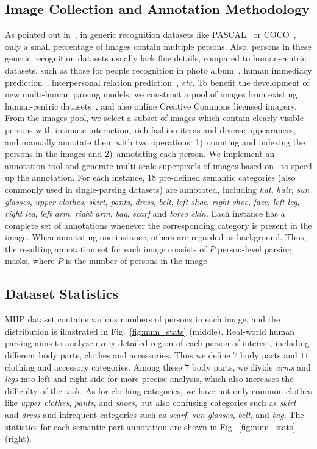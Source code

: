 \documentclass[10pt, letterpaper]{article}
\begin{document}
\subsection{Image Collection and Annotation Methodology}
As pointed out in~\cite{jiang2017detangling}, in generic recognition datasets like PASCAL~\cite{everingham2015pascal} or COCO~\cite{lin2014microsoft}, only a small percentage of images contain multiple persons. Also, persons in these generic recognition datasets usually lack fine details, compared to human-centric datasets, such as those for people recognition in photo album~\cite{piper}, human immediacy prediction~\cite{chu2015multi}, interpersonal relation prediction~\cite{SOCIALRELATION_2017}, \emph{etc.} To benefit the development of new multi-human parsing models, we construct a pool of images from existing human-centric datasets~\cite{modec13,chu2015multi,SOCIALRELATION_2017,piper}, and also online Creative Commons licensed imagery. From the images pool, we select a subset of images which contain clearly visible persons with intimate interaction, rich fashion items and diverse appearances, and manually annotate them with two operations: 1)~counting and indexing the persons in the images and 2)~annotating each person. We implement an annotation tool and generate multi-scale superpixels of images based on~\cite{arbelaez2011contour} to speed up the annotation. For each instance, $18$ pre-defined semantic categories (also commonly used in  single-parsing datasets) are annotated, including \emph{hat},  \emph{hair}, \emph{sun glasses}, \emph{upper clothes}, \emph{skirt}, \emph{pants}, \emph{dress}, \emph{belt}, \emph{left shoe}, \emph{right shoe}, \emph{face}, \emph{left leg}, \emph{right leg}, \emph{left arm}, \emph{right arm}, \emph{bag}, \emph{scarf} and \emph{torso skin}. Each instance has a complete set of annotations whenever the corresponding category is present in the image. When annotating one instance, others are regarded as background. Thus, the resulting annotation set for each image consists of $P$ person-level parsing masks, where $P$ is the number of persons in the image.

\subsection{Dataset Statistics}
MHP dataset contains various numbers of persons in each image, and the distribution is illustrated in Fig.~\ref{fig:num_stats} (middle). Real-world human parsing aims to analyze every detailed region of each person of interest, including different body parts, clothes and accessories. Thus we define $7$ body parts and $11$ clothing and accessory categories. Among these $7$ body parts, we divide \emph{arms} and \emph{legs} into left and right side for more precise analysis, which also increases the difficulty of the task. As for clothing categories, we have not only common clothes like \emph{upper clothes}, \emph{pants}, and \emph{shoes}, but also confusing categories such as \emph{skirt} and \emph{dress} and infrequent categories such as \emph{scarf},  \emph{sun glasses}, \emph{belt}, and \emph{bag}. The statistics for each semantic part annotation are shown in Fig.~\ref{fig:num_stats} (right).
\end{document}
